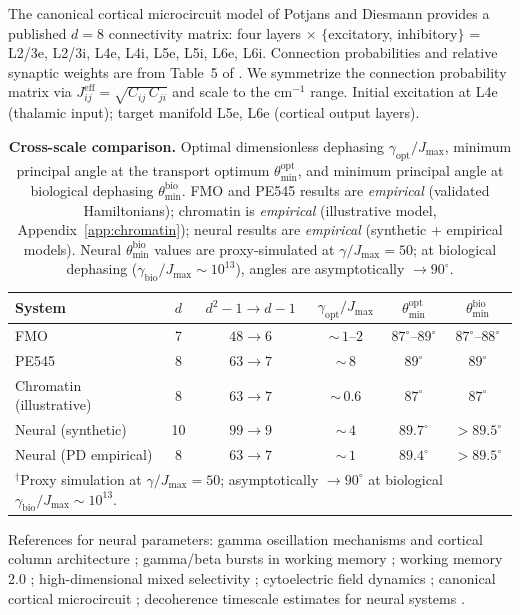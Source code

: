 \documentclass[12pt,a4paper]{article}
\theoremstyle{definition}
\theoremstyle{remark}
\begin{document}
The canonical cortical microcircuit model of Potjans and Diesmann \cite{potjans2014cell} provides a published $d = 8$ connectivity matrix: four layers $\times$ $\{$excitatory, inhibitory$\}$ = L2/3e, L2/3i, L4e, L4i, L5e, L5i, L6e, L6i. Connection probabilities and relative synaptic weights are from Table~5 of \cite{potjans2014cell}. We symmetrize the connection probability matrix via $J_{ij}^{\mathrm{eff}} = \sqrt{C_{ij}\,C_{ji}}$ and scale to the cm$^{-1}$ range. Initial excitation at L4e (thalamic input); target manifold L5e, L6e (cortical output layers).

\begin{table}[H]
\centering
\caption{\textbf{Cross-scale comparison.} Optimal dimensionless dephasing $\gamma_{\mathrm{opt}}/J_{\max}$, minimum principal angle at the transport optimum $\theta_{\min}^{\mathrm{opt}}$, and minimum principal angle at biological dephasing $\theta_{\min}^{\mathrm{bio}}$. FMO and PE545 results are \emph{empirical} (validated Hamiltonians); chromatin is \emph{empirical} (illustrative model, Appendix~\ref{app:chromatin}); neural results are \emph{empirical} (synthetic + empirical models). Neural $\theta_{\min}^{\mathrm{bio}}$ values are proxy-simulated at $\gamma/J_{\max} = 50$; at biological dephasing ($\gamma_{\mathrm{bio}}/J_{\max} \sim 10^{13}$), angles are asymptotically $\to 90^\circ$.}
\label{tab:neural-comparison}
\smallskip
\begin{tabular}{lccccc}
\hline
System & $d$ & $d^2{-}1 \to d{-}1$ & $\gamma_{\mathrm{opt}}/J_{\max}$ & $\theta_{\min}^{\mathrm{opt}}$ & $\theta_{\min}^{\mathrm{bio}}$ \\
\hline
FMO           &  7 & $48 \to 6$  & ${\sim}\,1$--$2$    & $87^\circ$--$89^\circ$ & $87^\circ$--$88^\circ$ \\
PE545         &  8 & $63 \to 7$  & ${\sim}\,8$         & $89^\circ$             & $89^\circ$ \\
Chromatin (illustrative)    &  8 & $63 \to 7$  & ${\sim}\,0.6$       & $87^\circ$             & $87^\circ$ \\
Neural (synthetic)  & 10 & $99 \to 9$  & ${\sim}\,4$         & $89.7^\circ$           & $>89.5^\circ$\rlap{$^\dagger$} \\
Neural (PD empirical)   &  8 & $63 \to 7$  & ${\sim}\,1$         & $89.4^\circ$           & $>89.5^\circ$\rlap{$^\dagger$} \\
\hline
\multicolumn{6}{l}{\small $^\dagger$Proxy simulation at $\gamma/J_{\max} = 50$; asymptotically $\to 90^\circ$ at biological $\gamma_{\mathrm{bio}}/J_{\max} \sim 10^{13}$.}
\end{tabular}
\end{table}

References for neural parameters: gamma oscillation mechanisms and cortical column architecture \cite{buzsaki2012mechanisms}; gamma/beta bursts in working memory \cite{lundqvist2016gamma}; working memory 2.0 \cite{miller2018working}; high-dimensional mixed selectivity \cite{fusi2016neurons,rigotti2013importance}; cytoelectric field dynamics \cite{pinotsis2023cytoelectric}; canonical cortical microcircuit \cite{potjans2014cell}; decoherence timescale estimates for neural systems \cite{tegmark2000importance}.
\end{document}

